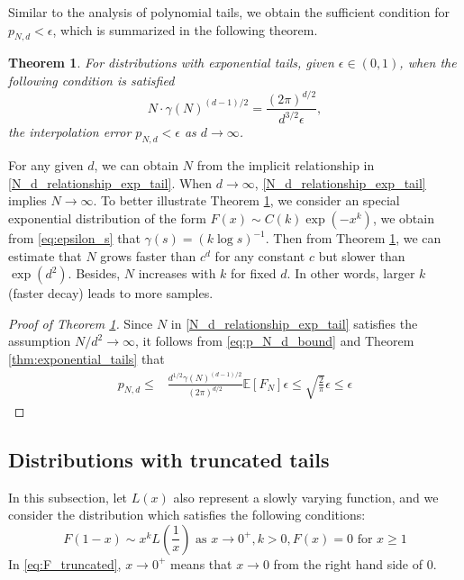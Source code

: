 \documentclass[conference,a4paper]{IEEEtran}
\def\E{\mathbb{E}}
\newtheorem{theorem}{Theorem}
\begin{document}
Similar to the analysis of polynomial tails, we obtain the
sufficient condition for $p_{N,d} < \epsilon$,
which is summarized in the following theorem.
\begin{theorem}\label{thm:exp_tails_sample}
  For distributions with exponential tails, given $\epsilon \in (0,1)$, when the following condition is satisfied
  \begin{equation}\label{N_d_relationship_exp_tail}
    N\cdot \gamma(N)^{(d-1)/2} = \frac{(2\pi)^{d/2} }{d^{3/2} \epsilon},
  \end{equation}
  the interpolation error $p_{N,d} < \epsilon$ as $d\to \infty$.
\end{theorem}
For any given $d$, we can obtain $N$ from the implicit relationship in \eqref{N_d_relationship_exp_tail}.
When $d\to \infty$, \eqref{N_d_relationship_exp_tail} implies $N\to \infty$.
To better illustrate Theorem \ref{thm:exp_tails_sample},
we consider an special exponential distribution of the form $F(x) \sim C(k)\exp(-x^k)$, we obtain from \eqref{eq:epsilon_s}
that $\gamma(s)=(k\log s)^{-1}$.
Then from Theorem \ref{thm:exp_tails_sample},
we can estimate that
$N$ grows faster than $c^d$ for any constant $c$ but slower than $\exp(d^2)$.
Besides, $N$ increases with $k$ for fixed $d$.
In other words, larger $k$ (faster decay) leads to more samples.
\begin{proof}[Proof of Theorem \ref{thm:exp_tails_sample}]
     Since $N$ in \eqref{N_d_relationship_exp_tail} satisfies the assumption $N/d^2 \to \infty$,
     it follows from \eqref{eq:p_N_d_bound} and Theorem \ref{thm:exponential_tails} that
     \begin{align*}
     p_{N,d} \leq &\frac{d^{1/2}\gamma(N)^{(d-1)/2}}{(2\pi)^{d/2}}
     \E[F_N]\epsilon
     \leq \sqrt{\frac{2}{\pi}}\epsilon \leq \epsilon
     \end{align*}
\end{proof}
\subsection{Distributions with truncated tails}
In this subsection, let $L(x)$ also represent a slowly varying function, and we consider the distribution which satisfies
the following conditions:
\begin{equation}\label{eq:F_truncated}
     F(1-x) \sim x^k L\left(\frac{1}{x} \right)  \text{ as } x \to 0^+, k> 0,
     F(x) = 0 \text{ for } x \geq 1
\end{equation}
In \eqref{eq:F_truncated}, $x \to 0^+$ means that $x\to 0$ from the right hand side of $0$.
\end{document}
